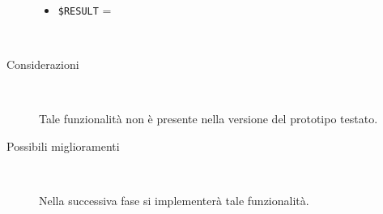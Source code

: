 \documentclass[../../SperimentazioniPratiche.tex]{subfiles}
\begin{document}
\begin{tcolorbox}[fonttitle=\bfseries, 
								adjusted title={\Large Prova 16A.1}, 
								breakable, 
								sharp corners=south,
								colback=white, 
								colframe=white!60!black]
\begin{description}[leftmargin=0.7cm,labelwidth=!]
\begin{description}
        					\item[\dispositivoC] \ \par
        					\begin{itemize}
        						\item \verb|$RESULT| = \ok
        					\end{itemize}
        					
        				\end{description}
        				
        			\tcbline
        			
        			\item[Analisi risultati] \ \par
        				\begin{description}
        					\item[Considerazioni] \ \par
        						Tale funzionalità non è presente nella versione del prototipo testato.
        					
        					\item[Possibili miglioramenti] \ \par 
        						Nella successiva fase si implementerà tale funzionalità.
        				\end{description}
        				
				\end{description}  
				
			\end{tcolorbox}
			
			\newpage		
\end{document}

